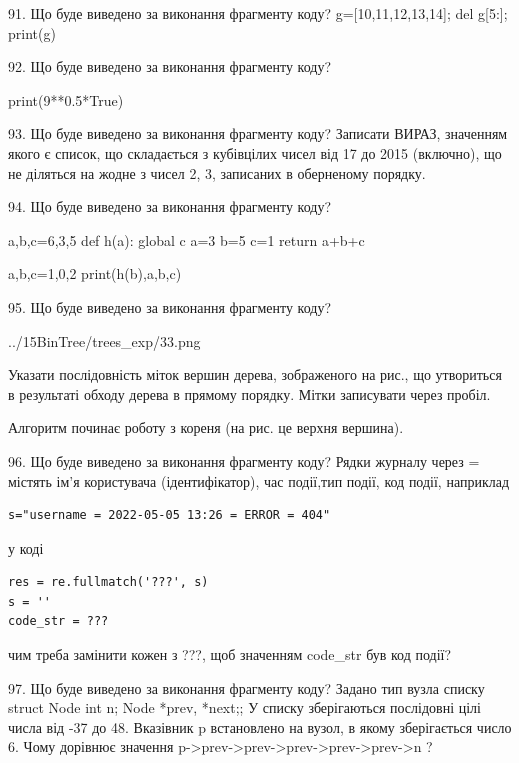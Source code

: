 \documentclass[11pt]{article}
\begin{document}

91. Що буде виведено за виконання фрагменту коду?
g=[10,11,12,13,14]; del g[5:]; print(g)

92. Що буде виведено за виконання фрагменту коду?

print(9**0.5*True)


93. Що буде виведено за виконання фрагменту коду?
Записати ВИРАЗ, значенням якого є список, що складається з кубівцілих чисел від 17 до 2015 (включно), що не діляться на жодне з чисел 2, 3, записаних в оберненому порядку.

94. Що буде виведено за виконання фрагменту коду?

a,b,c=6,3,5
def h(a):
global c    a=3
    b=5
    c=1
    return a+b+c

a,b,c=1,0,2
print(h(b),a,b,c)


95. Що буде виведено за виконання фрагменту коду?

\begin{center}
	{../15BinTree/trees_exp/33.png}
\end{center}
Указати послідовність міток вершин дерева, зображеного на рис., що утвориться в результаті обходу дерева в прямому порядку. Мітки записувати через пробіл.\par Алгоритм починає роботу з кореня (на рис. це верхня вершина).


96. Що буде виведено за виконання фрагменту коду?
Рядки журналу через = містять ім'я користувача (ідентифікатор), час події,тип події, код події, наприклад
\begin{verbatim}
s="username = 2022-05-05 13:26 = ERROR = 404"
\end{verbatim}
у коді 
\begin{verbatim}
res = re.fullmatch('???', s) 
s = ''
code_str = ??? 
\end{verbatim}
чим треба замінити кожен з ???, щоб значенням code\_str був код події? 




97. Що буде виведено за виконання фрагменту коду?
Задано тип вузла списку struct Node {int n; Node *prev, *next;};
У списку зберігаються послідовні цілі числа від -37 до 48. Вказівник p встановлено на вузол, в якому зберігається число 6.
Чому дорівнює значення p->prev->prev->prev->prev->prev->n ?
\end{document}
